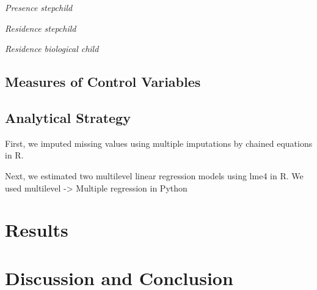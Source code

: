 \documentclass[\pandocDocMode,longtable,floatsintext]{apa6}
\begin{document}
\emph{Presence stepchild}

\emph{Residence stepchild}

\emph{Residence biological child}

\hypertarget{measures-of-control-variables}{%
\subsection{Measures of Control
Variables}\label{measures-of-control-variables}}

\hypertarget{analytical-strategy}{%
\subsection{Analytical Strategy}\label{analytical-strategy}}

First, we imputed missing values using multiple imputations by chained
equations in R.

Next, we estimated two multilevel linear regression models using lme4 in
R. We used multilevel -\textgreater{} Multiple regression in Python

\hypertarget{results}{%
\section{Results}\label{results}}

\hypertarget{discussion-and-conclusion}{%
\section{Discussion and Conclusion}\label{discussion-and-conclusion}}

\printbibliography[title=References]
\end{document}

